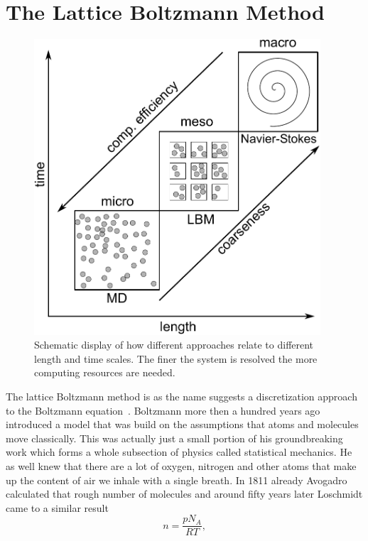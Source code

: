 \section{The Lattice Boltzmann Method}\label{sec:LBM}
\begin{figure}
    \centering
    \includegraphics[width=0.95\textwidth]{graphics/Scales_problem.pdf}
    \caption{Schematic display of how different approaches relate to different length and time scales.
    The finer the system is resolved the more computing resources are needed.}
    \label{fig:scales_dummy}
\end{figure}
The lattice Boltzmann method is as the name suggests a discretization approach to the Boltzmann equation~\cite{krueger2017, succi, wolf-gladrow}.
Boltzmann more then a hundred years ago introduced a model that was build on the assumptions that atoms and molecules move classically.
This was actually just a small portion of his groundbreaking work which forms a whole subsection of physics called statistical mechanics. 
He as well knew that there are a lot of oxygen, nitrogen and other atoms that make up the content of air we inhale with a single breath.
In 1811 already Avogadro calculated that rough number of molecules and around fifty years later Loschmidt came to a similar result~\cite{avogadro1811essai, loschmidt52grosse}
\begin{equation}
    n = \frac{p N_A}{R T},
\end{equation}
